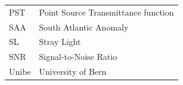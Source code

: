 \documentclass[a4paper,10pt]{article}
\begin{document}
\begin{appendices}
\begin{table}[!h]
\begin{center}
\begin{tabular}{lp{13.5cm}}
    PST & Point Source Transmittance function \\
    SAA & South Atlantic Anomaly \\
    SL & Stray Light \\
    SNR & Signal-to-Noise Ratio \\
     Unibe & University of Bern \\
   \bottomrule
  \end{tabular}
  \end{center}
\end{table}
\end{appendices}
\end{document}
